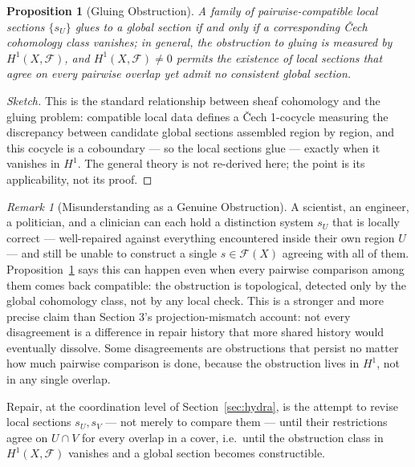 \documentclass[11pt]{article}
\theoremstyle{plain}
\newtheorem{proposition}[theorem]{Proposition}
\theoremstyle{definition}
\theoremstyle{remark}
\newtheorem{remark}[theorem]{Remark}
\begin{document}
\begin{proposition}[Gluing Obstruction]
\label{prop:gluing}
A family of pairwise-compatible local sections $\{s_U\}$ glues to a global section if and only if a corresponding \v{C}ech cohomology class vanishes; in general, the obstruction to gluing is measured by $H^1(X,\mathscr{F})$, and $H^1(X,\mathscr{F}) \ne 0$ permits the existence of local sections that agree on every pairwise overlap yet admit no consistent global section.
\end{proposition}
\begin{proof}[Sketch]
This is the standard relationship between sheaf cohomology and the gluing problem: compatible local data defines a \v{C}ech 1-cocycle measuring the discrepancy between candidate global sections assembled region by region, and this cocycle is a coboundary --- so the local sections glue --- exactly when it vanishes in $H^1$. The general theory is not re-derived here; the point is its applicability, not its proof.
\end{proof}

\begin{remark}[Misunderstanding as a Genuine Obstruction]
A scientist, an engineer, a politician, and a clinician can each hold a distinction system $s_U$ that is locally correct --- well-repaired against everything encountered inside their own region $U$ --- and still be unable to construct a single $s \in \mathscr{F}(X)$ agreeing with all of them. Proposition~\ref{prop:gluing} says this can happen even when every pairwise comparison among them comes back compatible: the obstruction is topological, detected only by the global cohomology class, not by any local check. This is a stronger and more precise claim than Section 3's projection-mismatch account: not every disagreement is a difference in repair history that more shared history would eventually dissolve. Some disagreements are obstructions that persist no matter how much pairwise comparison is done, because the obstruction lives in $H^1$, not in any single overlap.
\end{remark}

\begin{tcolorbox}[title=Repair as Gluing]
Repair, at the coordination level of Section~\ref{sec:hydra}, is the attempt to revise local sections $s_U, s_V$ --- not merely to compare them --- until their restrictions agree on $U \cap V$ for every overlap in a cover, i.e.\ until the obstruction class in $H^1(X,\mathscr{F})$ vanishes and a global section becomes constructible.
\end{tcolorbox}
\end{document}
